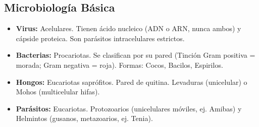 \documentclass[spanish,letterpaper,oneside]{article}
\begin{document}
\subsection{Microbiología Básica}
\begin{itemize}
    \item \textbf{Virus:} Acelulares. Tienen ácido nucleico (ADN o ARN, nunca ambos) y cápside proteica. Son parásitos intracelulares estrictos.
    \item \textbf{Bacterias:} Procariotas. Se clasifican por su pared (Tinción Gram positiva = morada; Gram negativa = roja). Formas: Cocos, Bacilos, Espirilos.
    \item \textbf{Hongos:} Eucariotas saprófitos. Pared de quitina. Levaduras (unicelular) o Mohos (multicelular hifas).
    \item \textbf{Parásitos:} Eucariotas. Protozoarios (unicelulares móviles, ej. Amibas) y Helmintos (gusanos, metazoarios, ej. Tenia).
\end{itemize}

\newpage
\end{document}
